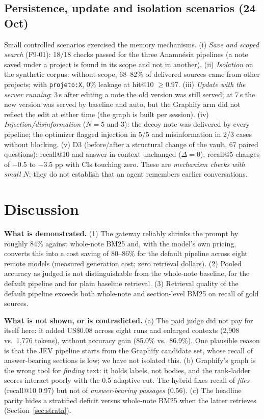 \documentclass[conference,onecolumn,11pt]{IEEEtran}
\newcommand{\anam}{Anam\-n\'esia}
\begin{document}
\subsection{Persistence, update and isolation scenarios (24 Oct)}
Small controlled scenarios exercised the memory mechanisms. (i) \emph{Save and scoped search} (F9-01): 18/18 checks passed for the three \anam{} pipelines (a note saved under a project is found in its scope and not in another). (ii) \emph{Isolation} on the synthetic corpus: without scope, 68--82\% of delivered sources came from other projects; with \texttt{projeto:X}, 0\% leakage at hit@10 $\ge0.97$. (iii) \emph{Update with the server running}: 3\,s after editing a note the old version was still served; at 7\,s the new version was served by baseline and auto, but the Graphify arm did not reflect the edit at either time (the graph is built per session). (iv) \emph{Injection/disinformation} ($N{=}5$ and 3): the decoy note was delivered by every pipeline; the optimizer flagged injection in 5/5 and misinformation in 2/3 cases without blocking. (v) D3 (before/after a structural change of the vault, 67 paired questions): recall@10 and answer-in-context unchanged ($\Delta=0$), recall@5 changes of $-0.5$ to $-3.5$ pp with CIs touching zero. These are \emph{mechanism checks with small $N$}; they do not establish that an agent remembers earlier conversations.

\FloatBarrier
\section{Discussion}
\textbf{What is demonstrated.} (1) The gateway reliably shrinks the prompt by roughly 84\% against whole-note BM25 and, with the model's own pricing, converts this into a cost saving of 80--86\% for the default pipeline across eight remote models (measured generation cost; zero retrieval dollars). (2) Pooled accuracy as judged is not distinguishable from the whole-note baseline, for the default pipeline and for plain baseline retrieval. (3) Retrieval quality of the default pipeline exceeds both whole-note and section-level BM25 on recall of gold sources.

\textbf{What is not shown, or is contradicted.} (a) The paid judge did not pay for itself here: it added US\$0.08 across eight runs and enlarged contexts (2,908 vs.\ 1,776 tokens), without accuracy gain (85.0\% vs.\ 86.9\%). One plausible reason is that the JEV pipeline starts from the Graphify candidate set, whose recall of answer-bearing sections is low; we have not isolated this. (b) Graphify's graph is the wrong tool for \emph{finding} text: it holds labels, not bodies, and the rank-ladder scores interact poorly with the 0.5 adaptive cut. The hybrid fixes recall of \emph{files} (recall@10 0.97) but not of \emph{answer-bearing passages} (0.56). (c) The headline parity hides a stratified deficit versus whole-note BM25 when the latter retrieves (Section~\ref{sec:strata}).
\end{document}

